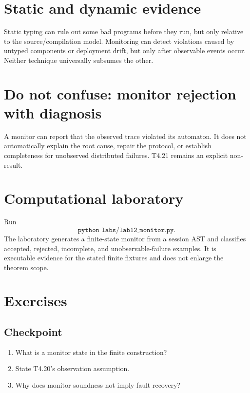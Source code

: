 

\section{Static and dynamic evidence}
Static typing can rule out some bad programs before they run, but only relative to the source/compilation model. Monitoring can detect violations caused by untyped components or deployment drift, but only after observable events occur. Neither technique universally subsumes the other.

\section{Do not confuse: monitor rejection with diagnosis}
\begin{warningbox}
A monitor can report that the observed trace violated its automaton. It does not automatically explain the root cause, repair the protocol, or establish completeness for unobserved distributed failures. T4.21 remains an explicit non-result.
\end{warningbox}



\section{Computational laboratory}
\begin{labbox}
Run
\[
  \texttt{python labs/lab12_monitor.py}.
\]
The laboratory generates a finite-state monitor from a session AST and classifies accepted, rejected, incomplete, and unobservable-failure examples. It is executable evidence for the stated finite fixtures and does not enlarge the theorem scope.
\end{labbox}

\section{Exercises}
\subsection*{Checkpoint}
\begin{enumerate}[label=\textbf{12.\arabic*},start=1]
\item What is a monitor state in the finite construction?
\item State T4.20's observation assumption.
\item Why does monitor soundness not imply fault recovery?
\end{enumerate}
